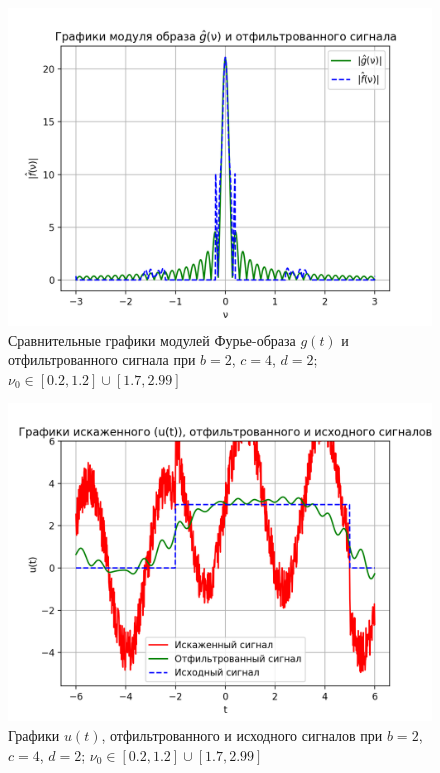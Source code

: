 \begin{figure}[ht!]
    \centering
    \includegraphics[scale=0.55]{media/1 task/specific_freq/Fourier_Image_Comparison_2_4_2_-1,2_-0,2_-2,99_-2,7_-2,7_-1,7.png}
    \caption{Сравнительные графики модулей Фурье-образа $g(t)$ и отфильтрованного сигнала при $b=2$, $c=4$, $d=2$; $\nu_0 \in [0.2, 1.2] \cup [1.7, 2.99]$}
    \label{fig:fourc_2_4_2_4}
\end{figure}

\begin{figure}[ht!]
    \centering
    \includegraphics[scale=0.65]{media/1 task/specific_freq/Cleaned_2_4_2_-1,2_-0,2_-2,99_-2,7_-2,7_-1,7.png}
    \caption{Графики  $u(t)$, отфильтрованного и исходного сигналов при $b=2$, $c=4$, $d=2$; $\nu_0 \in [0.2, 1.2] \cup [1.7, 2.99]$}
    \label{fig:cleaned_2_4_2_4}
\end{figure}

